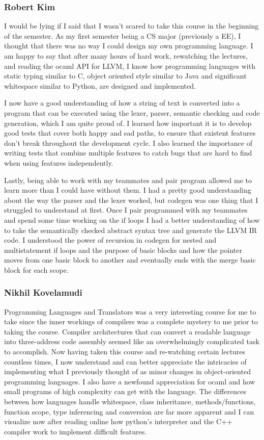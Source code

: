 \documentclass{article}
\begin{document}
\subsubsection{Robert Kim}
I would be lying if I said that I wasn't scared to take this course in the beginning of the semester. As my first semester being a CS major (previously a EE), I thought that there was no way I could design my own programming language. I am happy to say that after many hours of hard work, rewatching the lectures, and reading the ocaml API for LLVM, I know how programming languages with static typing similar to C, object oriented style similar to Java and significant whitespace similar to Python, are designed and implemented. 

I now have a good understanding of how a string of text is converted into a program that can be executed using the lexer, parser, semantic checking and code generation, which I am quite proud of. I learned how important it is to develop good tests that cover both happy and sad paths, to ensure that existent features don't break throughout the development cycle. I also learned the importance of writing tests that combine multiple features to catch bugs that are hard to find when using features independently. 

Lastly, being able to work with my teammates and pair program allowed me to learn more than I could have without them. I had a pretty good understanding about the way the parser and the lexer worked, but codegen was one thing that I struggled to understand at first. Once I pair programmed with my teammates and spend some time working on the if loops I had a better understanding of how to take the semantically checked abstract syntax tree and generate the LLVM IR code. I understood the power of recursion in codegen for nested and multistatement if loops and the purpose of basic blocks and how the pointer moves from one basic block to another and eventually ends with the merge basic block for each scope. 

\subsubsection{Nikhil Kovelamudi}
Programming Languages and Translators was a very interesting course for me to take since the inner workings of compilers was a complete mystery to me prior to taking the course.  Compiler architectures that can convert a readable language into three-address code assembly seemed like an overwhelmingly complicated task to accomplish.  Now having taken this course and re-watching certain lectures countless times, I now understand and can better appreciate the intricacies of implementing what I previously thought of as minor changes in object-oriented programming languages.  I also have a newfound appreciation for ocaml and how small programs of high complexity can get with the language.  The differences between how languages handle whitespace, class inheritance, methods/functions, function scope, type inferencing and conversion are far more apparent and I can visualize now after reading online how python's interpreter and the C++ compiler work to implement difficult features.  
\end{document}
